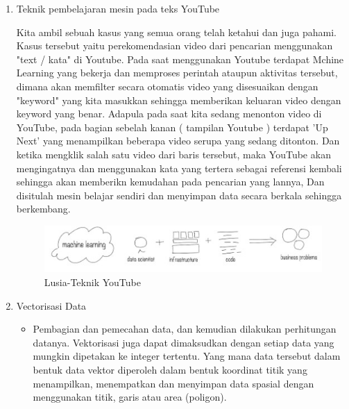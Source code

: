 \begin{enumerate}
\item Teknik pembelajaran mesin pada teks YouTube
	\par Kita ambil sebuah kasus yang semua orang telah ketahui dan juga pahami. Kasus tersebut yaitu perekomendasian video dari pencarian menggunakan "text / kata" di  Youtube. Pada saat menggunakan Youtube terdapat Mchine Learning yang bekerja dan memproses perintah ataupun aktivitas tersebut, dimana akan memfilter secara otomatis video yang disesuaikan dengan "keyword" yang kita masukkan sehingga memberikan keluaran video dengan keyword yang benar. Adapula pada saat kita sedang menonton video di YouTube, pada bagian sebelah kanan ( tampilan Youtube ) terdapat 'Up Next' yang menampilkan beberapa video serupa yang sedang ditonton. Dan ketika mengklik salah satu video dari baris tersebut, maka YouTube akan mengingatnya dan menggunakan kata yang tertera sebagai referensi kembali sehingga akan memberikn kemudahan pada pencarian yang lannya, Dan disitulah mesin belajar sendiri dan menyimpan data secara berkala sehingga berkembang. 

	\begin{figure}[ht]
		\centering
		\includegraphics[scale=0.5]{figures/AFS/k3.jpeg}
		\caption{Lusia-Teknik YouTube}
		\label{contoh}
	\end{figure}

\item Vectorisasi Data
	\begin{itemize}
		\item Pembagian dan pemecahan data, dan kemudian dilakukan perhitungan datanya. Vektorisasi juga dapat dimaksudkan dengan setiap data yang mungkin dipetakan ke integer tertentu. Yang mana data tersebut dalam bentuk data vektor diperoleh dalam bentuk koordinat titik yang menampilkan, menempatkan dan menyimpan data spasial dengan menggunakan titik, garis atau area (poligon). 
	\end{itemize}
	

\end{enumerate}
